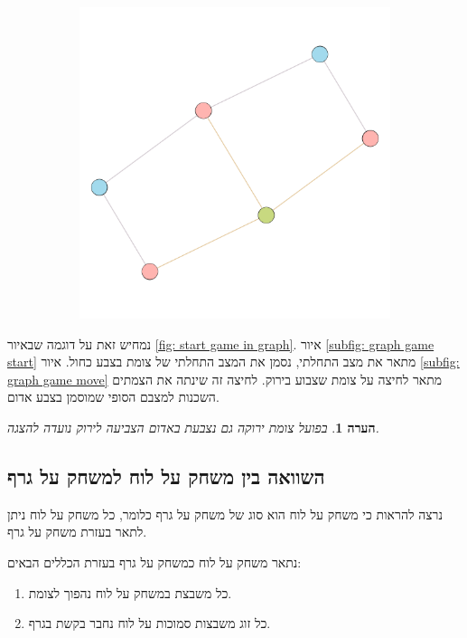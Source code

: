 \documentclass[12pt,leqno]{article}
\theoremstyle{theoremdd}
\newtheorem{comm}{הערה}[section]
\begin{document}
\begin{figure}[ht]
\begin{subfigure}{.5\textwidth}
        \includegraphics[scale=0.7]{images/graph_press.png}
    \end{subfigure}%
\end{figure}

נמחיש זאת על דוגמה שבאיור
\ref{fig: start game in graph}.
איור 
\ref{subfig: graph game start}
מתאר את מצב התחלתי, נסמן את המצב התחלתי של צומת בצבע כחול.
איור
\ref{subfig: graph game move}
מתאר לחיצה על צומת שצבוע בירוק.
לחיצה זה שינתה את הצמתים השכנות למצבם הסופי שמוסמן בצבע אדום.
\begin{comm}
    בפועל צומת ירוקה גם נצבעת באדום הצביעה לירוק נועדה להצגה.
\end{comm}

\subsection{השוואה בין משחק על לוח למשחק על גרף}
נרצה להראות כי משחק על לוח הוא סוג של משחק על גרף
כלומר, כל משחק על לוח ניתן לתאר בעזרת משחק על גרף.

נתאר משחק על לוח כמשחק על גרף בעזרת הכללים הבאים:
\begin{enumerate}
    \item 
    כל משבצת במשחק על לוח נהפוך לצומת.
    \item 
    כל זוג משבצות סמוכות על לוח נחבר בקשת בגרף.
\end{enumerate}
\end{document}
